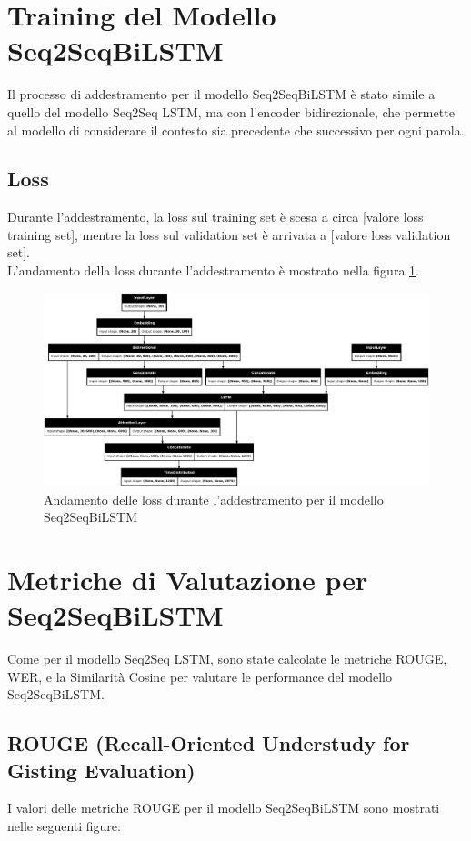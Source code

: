 \documentclass[a4paper, 12pt]{article}
\begin{document}
\section{Training del Modello Seq2SeqBiLSTM}
Il processo di addestramento per il modello Seq2SeqBiLSTM è stato simile a quello del modello Seq2Seq LSTM, ma con l'encoder bidirezionale, che permette al modello di considerare il contesto sia precedente che successivo per ogni parola.

\subsection{Loss}
Durante l'addestramento, la loss sul training set è scesa a circa [valore loss training set], mentre la loss sul validation set è arrivata a [valore loss validation set].\\
L'andamento della loss durante l'addestramento è mostrato nella figura \ref{fig:biLSTM_loss_plot}.

\begin{figure}[H]
    \centering
    \includegraphics[width=1\textwidth]{media/Seq2SeqBiLSTM_image.png}
    \caption{Andamento delle loss durante l'addestramento per il modello Seq2SeqBiLSTM}
    \label{fig:biLSTM_loss_plot}
\end{figure}

\section{Metriche di Valutazione per Seq2SeqBiLSTM}

Come per il modello Seq2Seq LSTM, sono state calcolate le metriche ROUGE, WER, e la Similarità Cosine per valutare le performance del modello Seq2SeqBiLSTM.

\subsection{ROUGE (Recall-Oriented Understudy for Gisting Evaluation)}
I valori delle metriche ROUGE per il modello Seq2SeqBiLSTM sono mostrati nelle seguenti figure:
\end{document}

